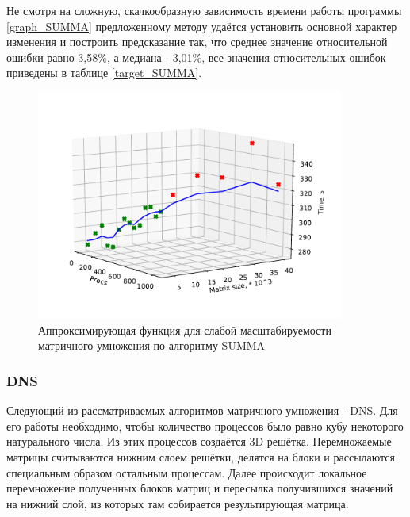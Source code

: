 		Не смотря на сложную, скачкообразную зависимость времени работы программы \eqref{graph_SUMMA} предложенному методу удаётся установить основной характер изменения и построить предсказание так, что среднее значение относительной ошибки равно 3,58\%, а медиана - 3,01\%, все значения относительных ошибок приведены в таблице \eqref{target_SUMMA}.

		\begin{figure}
			\centering
			\includegraphics[width=0.9\textwidth]{./images/graph_SUMMA}
			\caption{Аппроксимирующая функция для слабой масштабируемости матричного умножения по алгоритму SUMMA}
			\label{graph_SUMMA}
		\end{figure}

		\subsubsection{DNS}
			Следующий из рассматриваемых алгоритмов матричного умножения - DNS. Для его работы необходимо, чтобы количество процессов было равно кубу некоторого натурального числа. Из этих процессов создаётся 3D решётка. Перемножаемые матрицы считываются нижним слоем решётки, делятся на блоки и рассылаются специальным образом остальным процессам. Далее происходит локальное перемножение полученных блоков матриц и пересылка получившихся значений на нижний слой, из которых там собирается результирующая матрица.

